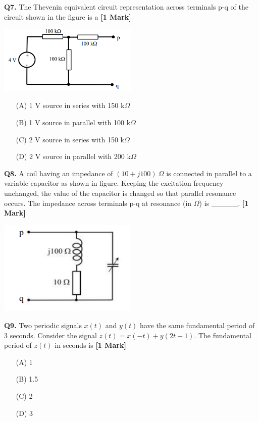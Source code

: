 \documentclass[11pt]{article}
\newcommand{\questiona}[2]{
    \noindent\textbf{Q#2.} #1 \hfill \textbf{[1 Mark]}
}
\begin{document}
\vspace{0.5cm}

\questiona{The Thevenin equivalent circuit representation across terminals p-q of the circuit shown in the figure is a}{7}
\begin{center}
\includegraphics[width=0.5\textwidth]{figures/7.png}
\end{center}
\begin{enumerate}
    \item[(A)] 1 V source in series with 150 k\(\Omega\)
    \item[(B)] 1 V source in parallel with 100 k\(\Omega\)
    \item[(C)] 2 V source in series with 150 k\(\Omega\)
    \item[(D)] 2 V source in parallel with 200 k\(\Omega\)
\end{enumerate}
\vspace{0.5cm}

\questiona{A coil having an impedance of \((10 + j100)\ \Omega\) is connected in parallel to a variable capacitor as shown in figure. Keeping the excitation frequency unchanged, the value of the capacitor is changed so that parallel resonance occurs. The impedance across terminals p-q at resonance (in \(\Omega\)) is \_\_\_\_\_.}{8}
\begin{center}
\includegraphics[width=0.5\textwidth]{figures/8.png}
\end{center}
\vspace{0.5cm}

\questiona{Two periodic signals \(x(t)\) and \(y(t)\) have the same fundamental period of 3 seconds. Consider the signal \(z(t) = x(-t) + y(2t + 1)\). The fundamental period of \(z(t)\) in seconds is}{9}
\begin{enumerate}
    \item[(A)] 1
    \item[(B)] 1.5
    \item[(C)] 2
    \item[(D)] 3
\end{enumerate}
\vspace{0.5cm}
\end{document}
